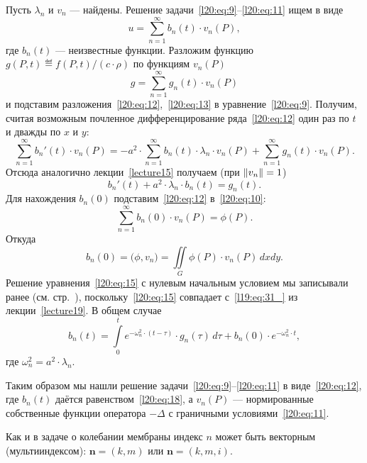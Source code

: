 Пусть $\lambda_n$ и $v_n$ --- найдены. Решение задачи~\eqref{l20:eq:9}--\eqref{l20:eq:11} ищем в виде
\begin{equation}\label{l20:eq:12}
	u=\sum\limits_{n=1}^{\infty}b_n(t)\cdot v_n(P),
\end{equation} 
где $b_n(t)$ --- неизвестные функции. Разложим функцию $g(P,t)\eqdef f(P,t)\big/(c\cdot\rho)$ по функциям $v_n(P)$
\begin{equation}\label{l20:eq:13}
	g=\sum\limits_{n=1}^{\infty} g_n(t)\cdot v_n(P)
\end{equation}
и подставим разложения~\eqref{l20:eq:12},~\eqref{l20:eq:13} в уравнение~\eqref{l20:eq:9}. Получим, считая возможным почленное дифференцирование ряда~\eqref{l20:eq:12} один раз по $t$ и дважды по $x$ и $y$:
\begin{equation}\label{l20:eq:14}
	\sum _{n=1}^{\infty } b_{n} '( t) \cdot v_{n}( P) =-a^{2} \cdot \sum _{n=1}^{\infty } b_{n}( t) \cdot \lambda _{n} \cdot v_{n}( P) +\sum _{n=1}^{\infty } g_{n}( t) \cdot v_{n}( P).
\end{equation}
Отсюда аналогично лекции~\ref{lecture15} получаем (при $\left\|v_n\right\|=1$)
\begin{equation}\label{l20:eq:15}
	b_n'(t)+a^2\cdot\lambda_n\cdot b_n(t)=g_n(t).
\end{equation}
Для нахождения $b_n(0)$ подставим~\eqref{l20:eq:12} в~\eqref{l20:eq:10}:
\begin{equation}\label{l20:eq:16}
	\sum_{n=1}^{\infty}b_n(0)\cdot v_n(P)=\phi(P).
\end{equation}
Откуда
\begin{equation}\label{l20:eq:17}
	b_n(0)=\big(\phi, v_n\big)=\iint\limits_{G}\phi(P)\cdot v_n(P)\,dxdy.
\end{equation}
Решение уравнения~\eqref{l20:eq:15} с нулевым начальным условием мы записывали ранее (см. стр.~\pageref{l19:eq:31_}), поскольку~\eqref{l20:eq:15} совпадает с~\eqref{l19:eq:31_} из лекции~\ref{lecture19}. В общем случае
\begin{equation}\label{l20:eq:18}
	b_n(t)=\int\limits_0^t e^{-\omega_n^2\cdot(t-\tau)}\cdot g_n(\tau)\,d\tau+b_n(0)\cdot e^{-\omega_n^2\cdot t},
\end{equation}
где $\omega_n^2=a^2\cdot \lambda_n$. 

Таким образом мы нашли решение задачи~\eqref{l20:eq:9}--\eqref{l20:eq:11} в виде~\eqref{l20:eq:12}, где $b_n(t)$ даётся равенством~\eqref{l20:eq:18}, а $v_n(P)$ --- нормированные собственные функции оператора $-\Delta$ с граничными условиями~\eqref{l20:eq:11}.
\begin{_rem}
	Как и в задаче о колебании мембраны индекс $n$ может быть векторным (мультииндексом): $\bm{n}=(k,m)$ или $\bm{n}=(k,m,i)$.
\end{_rem}

